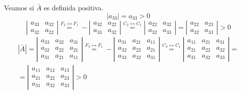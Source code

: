 \documentclass[12pt]{article}
\begin{document}
\begin{ejercicio}
\begin{enumerate}
\begin{description}
        Veamos si $\bar{A}$ es definida positiva.
        \begin{equation*}
            |a_{33}|=a_{33}>0
        \end{equation*}
        \begin{equation*}\left|\begin{array}{cc}
                a_{33} & a_{32} \\
                a_{32} & a_{22}
            \end{array}\right|
            \stackrel{F_2\leftrightarrow F_1}{=}-\left|\begin{array}{cc}
                a_{32} & a_{22} \\
                a_{33} & a_{32}
            \end{array}\right|
            \stackrel{C_2\leftrightarrow C_1}{=}
            \left|\begin{array}{cc}
                a_{22} & a_{32} \\
                a_{32} & a_{33}
            \end{array}\right|
            =\left|\begin{array}{cc}
                a_{22} & a_{23} \\
                a_{32} & a_{33}
            \end{array}\right| >0
        \end{equation*}
        \begin{multline*}
            |\bar{A}|=\left|\begin{array}{ccc}
                a_{33} & a_{32} & a_{31} \\
                a_{32} & a_{22} & a_{21} \\
                a_{31} & a_{21} & a_{11}
            \end{array}\right|
            \stackrel{F_3\leftrightarrow F_1}{=}
            -\left|\begin{array}{ccc}
                a_{31} & a_{21} & a_{11} \\
                a_{32} & a_{22} & a_{21} \\
                a_{33} & a_{32} & a_{31}
            \end{array}\right|
            \stackrel{C_3\leftrightarrow C_1}{=}
            \left|\begin{array}{ccc}
                a_{11} & a_{21} & a_{31} \\
                a_{21} & a_{22} & a_{32} \\
                a_{31} & a_{32} & a_{33}
            \end{array}\right|
            =\\= 
            \left|\begin{array}{ccc}
                a_{11} & a_{12} & a_{13} \\
                a_{21} & a_{22} & a_{23} \\
                a_{31} & a_{32} & a_{33}
            \end{array}\right|>0
        \end{multline*}


\end{description}
\end{enumerate}
\end{ejercicio}
\end{document}
